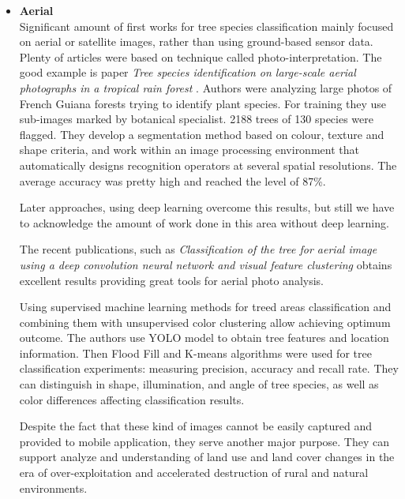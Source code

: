 \documentclass[../Main.tex]{subfiles}
\begin{document}
\begin{itemize}
        \item \textbf{Aerial} \\
         Significant amount of first works for tree species classification mainly focused on aerial or satellite images, rather than using ground-based sensor data. Plenty of articles were based on technique called photo-interpretation. The good example is paper \textit{Tree species identification on large-scale aerial photographs in a tropical rain forest} \cite{VALERIE200651}. Authors were analyzing large photos of French Guiana forests trying to identify plant species. For training they use sub-images marked by botanical specialist. 2188 trees of 130 species were flagged. They develop a segmentation method based on colour, texture and shape criteria, and work within an image processing environment that automatically designs recognition operators at several spatial resolutions.  The average accuracy was pretty high and reached the level of 87\%. 
         
         Later approaches, using deep learning overcome this results, but still we have to acknowledge the amount of work done in this area without deep learning. 
         
         The recent publications, such as \textit{Classification of the tree for aerial image using a deep convolution neural network and visual feature clustering} \cite{Lin2020} obtains excellent results providing great tools for aerial photo analysis.
         
         Using supervised machine learning methods for treed areas classification and combining them with unsupervised color clustering allow achieving optimum outcome.
         The authors use YOLO model to obtain tree features and location information. Then Flood Fill and K-means algorithms were used for tree classification experiments: measuring precision, accuracy and recall rate. They can distinguish in shape, illumination, and angle of tree species, as well as color differences affecting classification results. 
         
         Despite the fact that these kind of images cannot be easily captured and provided to mobile application, they serve another major purpose. They can support analyze and understanding of land use and land cover changes in the era of over-exploitation and accelerated destruction of rural and natural environments.


\end{itemize}
\end{document}

